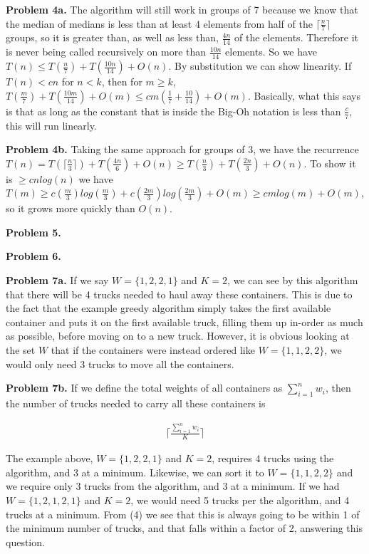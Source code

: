 \documentclass{article}
\begin{document}
\hfill

\textbf{Problem 4a.} The algorithm will still work in groups of 7 because we know that the median of medians is less than at least 4 elements from half of the $\lceil \frac{n}{7} \rceil$ groups, so it is greater than, as well as less than, $\frac{4n}{14}$ of the elements. Therefore it is never being called recursively on more than $\frac{10n}{14}$ elements. So we have $T(n) \leq T(\frac{n}{7}) + T(\frac{10n}{14}) + O(n)$. By substitution we can show linearity. If $T(n) < cn$ for $n < k$, then for $m \geq k$, $T(\frac{m}{7}) + T(\frac{10m}{14}) + O(m) \leq cm(\frac{1}{7} + \frac{10}{14}) + O(m)$. Basically, what this says is that as long as the constant that is inside the Big-Oh notation is less than $\frac{c}{7}$, this will run linearly. 

\hfill

\textbf{Problem 4b.} Taking the same approach for groups of 3, we have the recurrence $T(n) = T(\lceil \frac{n}{3} \rceil) + T(\frac{4n}{6}) + O(n) \geq T(\frac{n}{3}) + T(\frac{2n}{3}) + O(n)$. To show it is $\geq cnlog(n)$ we have $T(m) \geq c(\frac{m}{3})log(\frac{m}{3}) + c(\frac{2m}{3})log(\frac{2m}{3}) + O(m) \geq cmlog(m) + O(m)$, so it grows more quickly than $O(n)$.

\hfill

\textbf{Problem 5.}

\hfill

\textbf{Problem 6.} 

\hfill

\textbf{Problem 7a.} If we say $W = \{1, 2, 2, 1\}$ and $K = 2$, we can see by this algorithm that there will be 4 trucks needed to haul away these containers. This is due to the fact that the example greedy algorithm simply takes the first available container and puts it on the first available truck, filling them up in-order as much as possible, before moving on to a new truck. However, it is obvious looking at the set $W$ that if the containers were instead ordered like $W = \{1, 1, 2, 2\}$, we would only need 3 trucks to move all the containers.

\hfill

\textbf{Problem 7b.} If we define the total weights of all containers as $\sum_{i=1}^{n} w_i$, then the number of trucks needed to carry all these containers is 

\begin{gather}
    \lceil \frac{\sum_{i=1}^{n} w_i}{K} \rceil
\end{gather}

The example above, $W = \{1, 2, 2, 1\}$ and $K = 2$, requires 4 trucks using the algorithm, and 3 at a minimum. Likewise, we can sort it to $W = \{1, 1, 2, 2\}$ and we require only 3 trucks from the algorithm, and 3 at a minimum. If we had $W = \{1, 2, 1, 2, 1\}$ and $K = 2$, we would need 5 trucks per the algorithm, and 4 trucks at a minimum. From (4) we see that this is always going to be within 1 of the minimum number of trucks, and that falls within a factor of 2, answering this question.

\newpage
 

\end{document}
